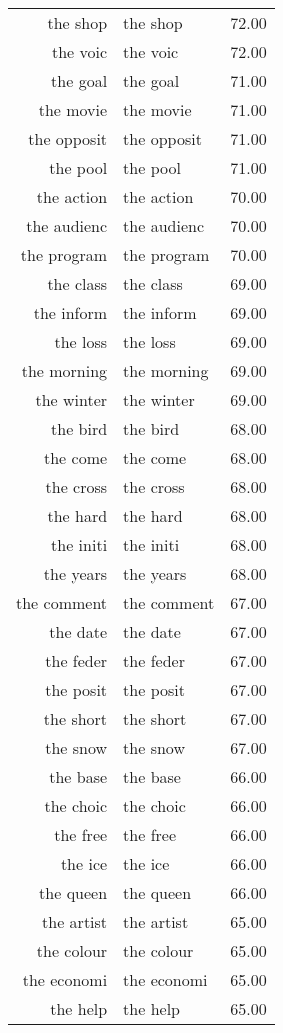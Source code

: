 \begin{table}[ht]
\begin{tabular}{rlr}
  the shop & the shop & 72.00 \\ 
  the voic & the voic & 72.00 \\ 
  the goal & the goal & 71.00 \\ 
  the movie & the movie & 71.00 \\ 
  the opposit & the opposit & 71.00 \\ 
  the pool & the pool & 71.00 \\ 
  the action & the action & 70.00 \\ 
  the audienc & the audienc & 70.00 \\ 
  the program & the program & 70.00 \\ 
  the class & the class & 69.00 \\ 
  the inform & the inform & 69.00 \\ 
  the loss & the loss & 69.00 \\ 
  the morning & the morning & 69.00 \\ 
  the winter & the winter & 69.00 \\ 
  the bird & the bird & 68.00 \\ 
  the come & the come & 68.00 \\ 
  the cross & the cross & 68.00 \\ 
  the hard & the hard & 68.00 \\ 
  the initi & the initi & 68.00 \\ 
  the years & the years & 68.00 \\ 
  the comment & the comment & 67.00 \\ 
  the date & the date & 67.00 \\ 
  the feder & the feder & 67.00 \\ 
  the posit & the posit & 67.00 \\ 
  the short & the short & 67.00 \\ 
  the snow & the snow & 67.00 \\ 
  the base & the base & 66.00 \\ 
  the choic & the choic & 66.00 \\ 
  the free & the free & 66.00 \\ 
  the ice & the ice & 66.00 \\ 
  the queen & the queen & 66.00 \\ 
  the artist & the artist & 65.00 \\ 
  the colour & the colour & 65.00 \\ 
  the economi & the economi & 65.00 \\ 
  the help & the help & 65.00 \\ 

\end{tabular}
\end{table}
